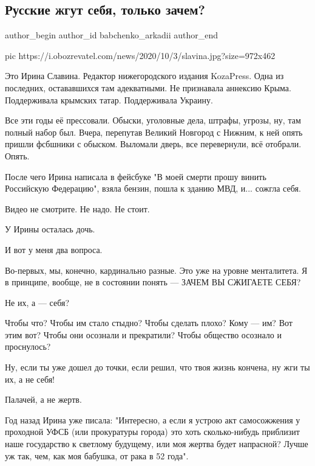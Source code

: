  
 
 
 
 
\subsection{Русские жгут себя, только зачем?}

\ifcmt
  author_begin
   author_id babchenko_arkadii
  author_end
\fi

\ifcmt
pic https://i.obozrevatel.com/news/2020/10/3/slavina.jpg?size=972x462
\fi

Это Ирина Славина. Редактор нижегородского издания KozaPress. Одна из
последних, остававшихся там адекватными. Не признавала аннексию Крыма.
Поддерживала крымских татар. Поддерживала Украину.

Все эти годы её прессовали. Обыски, уголовные дела, штрафы, угрозы, ну, там
полный набор был. Вчера, перепутав Великий Новгород с Нижним, к ней опять
пришли фсбшники с обыском. Выломали дверь, все перевернули, всё отобрали.
Опять.

После чего Ирина написала в фейсбуке "В моей смерти прошу винить Российскую
Федерацию", взяла бензин, пошла к зданию МВД, и... сожгла себя.

Видео не смотрите. Не надо. Не стоит.

У Ирины осталась дочь.

И вот у меня два вопроса.

Во-первых, мы, конечно, кардинально разные. Это уже на уровне менталитета. Я в
принципе, вообще, не в состоянии понять --- ЗАЧЕМ ВЫ СЖИГАЕТЕ СЕБЯ?

Не их, а --- себя?

Чтобы что? Чтобы им стало стыдно? Чтобы сделать плохо? Кому --- им? Вот этим вот?
Чтобы они осознали и прекратили? Чтобы общество осознало и проснулось?

Ну, если ты уже дошел до точки, если решил, что твоя жизнь кончена, ну жги ты
их, а не себя!

Палачей, а не жертв.

Год назад Ирина уже писала: "Интересно, а если я устрою акт самосожжения у
проходной УФСБ (или прокуратуры города) это хоть сколько-нибудь приблизит наше
государство к светлому будущему, или моя жертва будет напрасной? Лучше уж так,
чем, как моя бабушка, от рака в 52 года".

